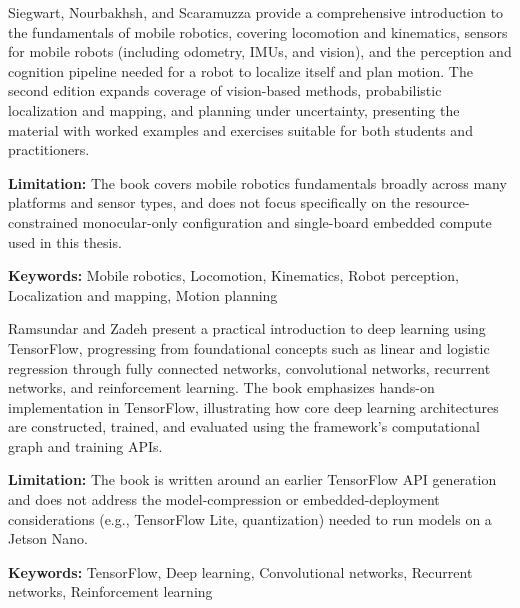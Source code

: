 {
	Siegwart, Nourbakhsh, and Scaramuzza \cite{Siegwart:2011} provide a comprehensive introduction to the fundamentals of mobile robotics, covering locomotion and kinematics, sensors for mobile robots (including odometry, IMUs, and vision), and the perception and cognition pipeline needed for a robot to localize itself and plan motion. The second edition expands coverage of vision-based methods, probabilistic localization and mapping, and planning under uncertainty, presenting the material with worked examples and exercises suitable for both students and practitioners.
	
	\bigskip
	\textbf{Limitation:} The book covers mobile robotics fundamentals broadly across many platforms and sensor types, and does not focus specifically on the resource-constrained monocular-only configuration and single-board embedded compute used in this thesis.
	
	\scriptsize{\textbf{Keywords:} Mobile robotics, Locomotion, Kinematics, Robot perception, Localization and mapping, Motion planning}
}

{
	Ramsundar and Zadeh \cite{Ramsundar:2018} present a practical introduction to deep learning using TensorFlow, progressing from foundational concepts such as linear and logistic regression through fully connected networks, convolutional networks, recurrent networks, and reinforcement learning. The book emphasizes hands-on implementation in TensorFlow, illustrating how core deep learning architectures are constructed, trained, and evaluated using the framework's computational graph and training APIs.
	
	\bigskip
	\textbf{Limitation:} The book is written around an earlier TensorFlow API generation and does not address the model-compression or embedded-deployment considerations (e.g., TensorFlow Lite, quantization) needed to run models on a Jetson Nano.
	
	\scriptsize{\textbf{Keywords:} TensorFlow, Deep learning, Convolutional networks, Recurrent networks, Reinforcement learning}
}

